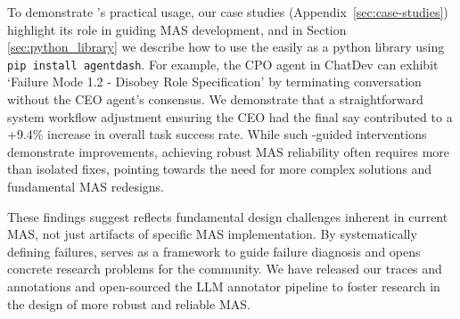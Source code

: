 To demonstrate \taxonomy{}'s practical usage, our case studies (Appendix~\ref{sec:case-studies}) highlight its role in guiding MAS development, and in Section \ref{sec:python_library} we describe how to use the \taxonomy{} easily as a python library using \verb|pip install agentdash|. For example, the CPO agent in ChatDev can exhibit `Failure Mode 1.2 - Disobey Role Specification' by terminating conversation without the CEO agent's consensus. We demonstrate that a straightforward system workflow adjustment ensuring the CEO had the final say contributed to a +9.4\% increase in overall task success rate. While such \taxonomy{}-guided interventions demonstrate improvements, achieving robust MAS reliability often requires more than isolated fixes, pointing towards the need for more complex solutions and fundamental MAS redesigns.




These findings suggest \taxonomy{} reflects fundamental design challenges inherent in current MAS, not just artifacts of specific MAS implementation. By systematically defining failures, \taxonomy{} serves as a framework to guide failure diagnosis and opens concrete research problems for the community. 
We have released our traces and annotations and open-sourced the LLM annotator pipeline to foster research in the design of more robust and reliable MAS.


